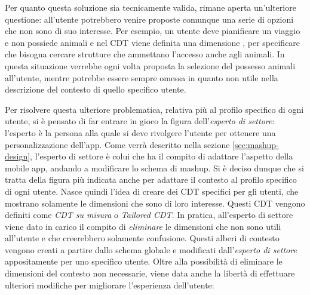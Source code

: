 Per quanto questa soluzione sia tecnicamente valida, rimane aperta un'ulteriore questione: all'utente potrebbero venire proposte comunque una serie di opzioni che non sono di suo interesse. Per esempio, un utente deve pianificare un viaggio e non possiede animali e nel CDT viene definita una dimensione , per specificare che bisogna cercare strutture che ammettano l'accesso anche agli animali. In questa situazione verrebbe ogni volta proposta la selezione del possesso animali all'utente, mentre potrebbe essere sempre omessa in quanto non utile nella descrizione del contesto di quello specifico utente.

Per risolvere questa ulteriore problematica, relativa più al profilo specifico di ogni utente, si è pensato di far entrare in gioco la figura dell'\emph{esperto di settore}: l'esperto è la persona alla quale si deve rivolgere l'utente per ottenere una personalizzazione dell'app. Come verrà descritto nella sezione \ref{sec:mashup-design}, l'esperto di settore è colui che ha il compito di adattare l'aspetto della mobile app, andando a  modificare lo schema di mashup. Si è deciso dunque che si tratta della figura più indicata anche per adattare il contesto al profilo specifico di ogni utente. Nasce quindi l'idea di creare dei CDT specifici per gli utenti, che mostrano solamente le dimensioni che sono di loro interesse. Questi CDT vengono definiti come \emph{CDT su misura} o \emph{Tailored CDT}. In pratica, all'esperto di settore viene dato in carico il compito di \emph{eliminare} le dimensioni che non sono utili all'utente e che creerebbero solamente confusione. Questi alberi di contesto vengono creati a partire dallo schema globale e modificati dall'\emph{esperto di settore} appositamente per uno specifico utente. Oltre alla possibilità di eliminare le dimensioni del contesto non necessarie, viene data anche la libertà di effettuare ulteriori modifiche per migliorare l'esperienza dell'utente:


